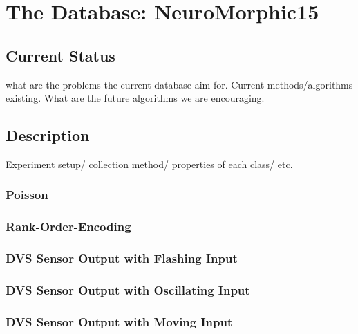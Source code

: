 \section{The Database: NeuroMorphic15}
\label{sec:data}
\subsection{Current Status}
what are the problems the current database aim for.
Current methods/algorithms existing.
What are the future algorithms we are encouraging.
\subsection{Description}
	Experiment setup/ collection method/ properties of each class/ etc.
	\subsubsection{Poisson}
	\subsubsection{Rank-Order-Encoding}
	\subsubsection{DVS Sensor Output with Flashing Input}
	\subsubsection{DVS Sensor Output with Oscillating Input}
	\subsubsection{DVS Sensor Output with Moving Input}
	